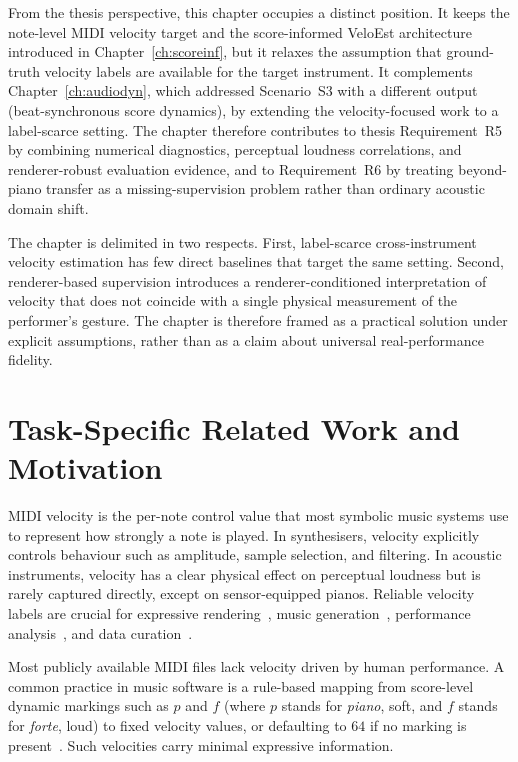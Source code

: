 From the thesis perspective, this chapter occupies a distinct position. It keeps the note-level MIDI velocity target and the score-informed VeloEst architecture introduced in Chapter~\ref{ch:scoreinf}, but it relaxes the assumption that ground-truth velocity labels are available for the target instrument. It complements Chapter~\ref{ch:audiodyn}, which addressed Scenario~S3 with a different output (beat-synchronous score dynamics), by extending the velocity-focused work to a label-scarce setting. The chapter therefore contributes to thesis Requirement~R5 by combining numerical diagnostics, perceptual loudness correlations, and renderer-robust evaluation evidence, and to Requirement~R6 by treating beyond-piano transfer as a missing-supervision problem rather than ordinary acoustic domain shift.

The chapter is delimited in two respects. First, label-scarce cross-instrument velocity estimation has few direct baselines that target the same setting. Second, renderer-based supervision introduces a renderer-conditioned interpretation of velocity that does not coincide with a single physical measurement of the performer's gesture. The chapter is therefore framed as a practical solution under explicit assumptions, rather than as a claim about universal real-performance fidelity.

\section{Task-Specific Related Work and Motivation}
\label{sec:bp:related}

MIDI velocity is the per-note control value that most symbolic music systems use to represent how strongly a note is played. In synthesisers, velocity explicitly controls behaviour such as amplitude, sample selection, and filtering. In acoustic instruments, velocity has a clear physical effect on perceptual loudness but is rarely captured directly, except on sensor-equipped pianos. Reliable velocity labels are crucial for expressive rendering~\cite{rhyu2022sketching, zhang2024dexter}, music generation~\cite{tang2025integrated, borovik2025symupe}, performance analysis~\cite{morsi2025enable_rach3}, and data curation~\cite{zhang2022atepp}.

Most publicly available MIDI files lack velocity driven by human performance. A common practice in music software is a rule-based mapping from score-level dynamic markings such as $p$ and $f$ (where $p$ stands for \emph{piano}, soft, and $f$ stands for \emph{forte}, loud) to fixed velocity values, or defaulting to $64$ if no marking is present~\cite{dan2006psy}. Such velocities carry minimal expressive information.

